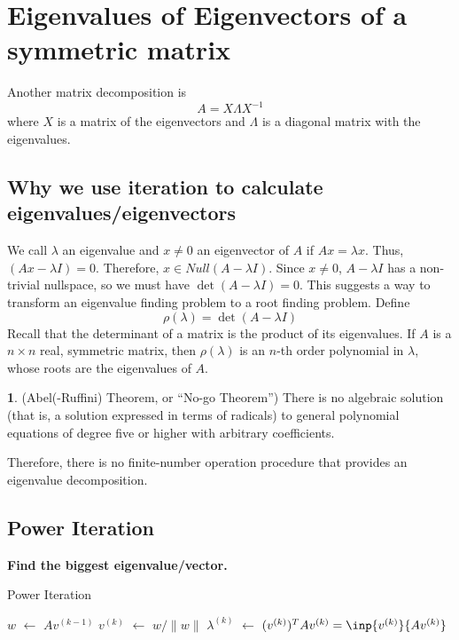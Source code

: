 \documentclass[12pt]{article}
\theoremstyle{definition}
\newcommand{\norm}[1]{\lVert#1\rVert}
\newcommand*\Let[2]{\State #1 $\gets$ #2}
\newtheorem{theorem}{\color{ForestGreen}{\textbf{Theorem}}}
\theoremstyle{definition}
\begin{document}
\section{Eigenvalues of Eigenvectors of a symmetric matrix}

Another matrix decomposition is
\begin{equation}
	A = X \Lambda X^{-1}
\end{equation}
where $X$ is a matrix of the eigenvectors and $\Lambda$ is a diagonal matrix with the eigenvalues. 

\subsection{Why we use iteration to calculate eigenvalues/eigenvectors}
We call $\lambda$ an eigenvalue and $x \neq 0$ an eigenvector of $A$ if $Ax = \lambda x$. Thus, $(Ax - \lambda I) = 0$. Therefore, $x \in Null(A - \lambda I)$. Since $x \neq 0$, $A - \lambda I$ has a non-trivial nullspace, so we must have $\det(A - \lambda I) = 0$. This suggests a way to transform an eigenvalue finding problem to a root finding problem. Define
\begin{equation}
	\rho(\lambda) = \det(A - \lambda I)
\end{equation}
Recall that the determinant of a matrix is the product of its eigenvalues. If $A$ is a $n \times n$ real, symmetric matrix, then $\rho(\lambda)$ is an $n$-th order polynomial in $\lambda$, whose roots are the eigenvalues of $A$. 

\begin{theorem}(Abel(-Ruffini) Theorem, or ``No-go Theorem'')
There is no algebraic solution (that is, a solution expressed in terms of radicals) to general polynomial equations of degree five or higher with arbitrary coefficients.  
\end{theorem}

Therefore, there is no finite-number operation procedure that provides an eigenvalue decomposition. 

\subsection{Power Iteration}
\textbf{Find the biggest eigenvalue/vector.}

\begin{algorithm}[ht]
  \caption{Power Iteration}
  \begin{algorithmic}[1]
    \Require{$v^{(0)} =$ some vector with $\norm{v^{(0)}} = 1$}
	    \Let{$w$}{$Av^{(k-1)}$} 
	    \Let{$v^{(k)}$}{$w/ \norm{w}$} 
	    \Let{$\lambda^{(k)}$}{$(v^{(k)})^T Av^{(k)} = \inp{v^{(k)}}{Av^{(k)}}$} 
    \EndFor
  \end{algorithmic}
\end{algorithm}
\end{document}
